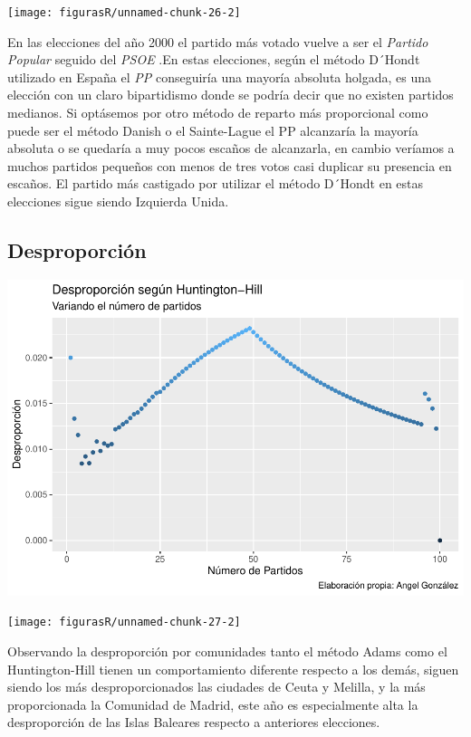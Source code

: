 \documentclass[12pt,a4paper,]{book}
\numberwithin{dummy}{section}
\theoremstyle{ocrenumbox}
\theoremstyle{blacknumex}
\theoremstyle{blacknumbox}
\theoremstyle{ocrenum}
\theoremstyle{ocrenum}
\begin{document}
\begin{center}\texttt{[image: figurasR/unnamed-chunk-26-2]} \end{center}

En las elecciones del año 2000 el partido más votado vuelve a ser el
\emph{Partido Popular} seguido del \emph{PSOE} .En estas elecciones,
según el método D´Hondt utilizado en España el \emph{PP} conseguiría una
mayoría absoluta holgada, es una elección con un claro bipartidismo
donde se podría decir que no existen partidos medianos. Si optásemos por
otro método de reparto más proporcional como puede ser el método Danish
o el Sainte-Lague el PP alcanzaría la mayoría absoluta o se quedaría a
muy pocos escaños de alcanzarla, en cambio veríamos a muchos partidos
pequeños con menos de tres votos casi duplicar su presencia en escaños.
El partido más castigado por utilizar el método D´Hondt en estas
elecciones sigue siendo Izquierda Unida.

\hypertarget{desproporciuxf3n-7}{%
\subsection{Desproporción}\label{desproporciuxf3n-7}}

\begin{center}\includegraphics[width=1\linewidth]{figurasR/unnamed-chunk-27-1} \end{center}

\begin{center}\texttt{[image: figurasR/unnamed-chunk-27-2]} \end{center}

Observando la desproporción por comunidades tanto el método Adams como
el Huntington-Hill tienen un comportamiento diferente respecto a los
demás, siguen siendo los más desproporcionados las ciudades de Ceuta y
Melilla, y la más proporcionada la Comunidad de Madrid, este año es
especialmente alta la desproporción de las Islas Baleares respecto a
anteriores elecciones.
\end{document}
